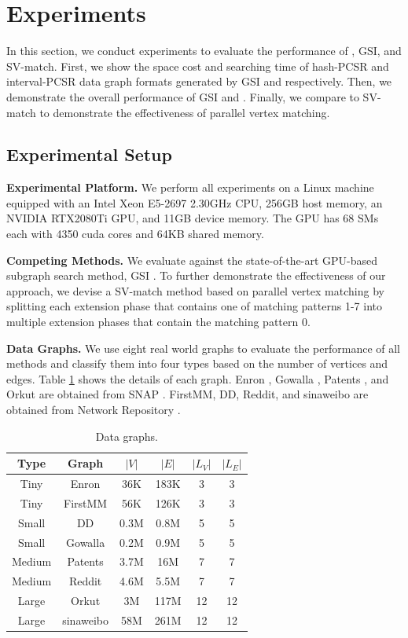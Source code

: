 \section{Experiments}
In this section, we conduct experiments to evaluate the performance of \SystemName, GSI, and SV-match. First, we show the space cost and searching time of hash-PCSR and interval-PCSR data graph formats generated by GSI and \SystemName respectively. Then, we demonstrate the overall performance of GSI and \SystemName. Finally, we compare \SystemName to SV-match to demonstrate the effectiveness of parallel vertex matching.
\subsection{Experimental Setup}
\textbf{Experimental Platform.} We perform all experiments on a Linux machine equipped with an Intel Xeon E5-2697 2.30GHz CPU, 256GB host memory, an NVIDIA RTX2080Ti GPU, and 11GB device memory. The GPU has 68 SMs each with 4350 cuda cores and 64KB shared memory.

\textbf{Competing Methods.} We evaluate \SystemName against the state-of-the-art GPU-based subgraph search method, GSI \cite{zeng2020gsi}. To further demonstrate the effectiveness of our approach, we devise a SV-match method based on parallel vertex matching by splitting each extension phase that contains one of matching patterns 1-7 into multiple extension phases that contain the matching pattern 0.

\textbf{Data Graphs.} We use eight real world graphs to evaluate the performance of all methods and classify them into four types based on the number of vertices and edges. Table \ref{tab:datagraph} shows the details of each graph. Enron \cite{leskovec2009community}, Gowalla \cite{cho2011friendship}, Patents \cite{leskovec2005graphs}, and Orkut \cite{yang2015defining} are obtained from SNAP \cite{snapnets}. FirstMM, DD, Reddit, and sinaweibo are obtained from Network Repository \cite{ryan2015network,nr-sigkdd16}.

\begin{table}
\centering
  \caption{Data graphs.}
  \label{tab:datagraph}
  \begin{tabular}{cccccc}
  \hline
    Type&Graph &$|V|$&$|E|$&$|L_V|$&$|L_E|$\\
    \hline
    Tiny	&Enron		&36K	&183K	&3	&3 \\
    Tiny	&FirstMM 	&56K	&126K	&3	&3 \\
    Small	&DD			&0.3M	&0.8M	&5	&5\\
    Small	&Gowalla	&0.2M	&0.9M	&5	&5\\
    Medium	&Patents	&3.7M	&16M	&7	&7\\
    Medium	&Reddit		&4.6M	&5.5M	&7	&7\\
    Large	&Orkut		&3M		&117M	&12	&12\\
	Large	&sinaweibo	&58M	&261M	&12	&12\\

    \hline
  \end{tabular}
\end{table}


